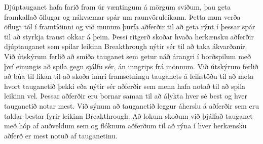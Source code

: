 Djúptauganet hafa farið fram úr væntingum á mörgum sviðum, þau geta framkallað öflugar og nákvæmar spár um raunvöruleikann. Þetta mun verða öflugt tól í framtíðinni og við munum þurfa aðferðir til að geta rýnt í þessar spár til að styrkja traust okkar á þeim. Þessi ritgerð skoðar hvaða herkænsku aðferðir djúptauganet sem spilar leikinn Breakthrough nýtir sér til að taka ákvarðanir. Við útskýrum ferlið að smíða tauganet sem getur náð árangri í borðspilum með því einungis að spila gegn sjálfu sér, án inngrips frá mönnum. Við útskýrum ferlið að búa til líkan til að skoða innri framsetningu tauganets á leikstöðu til að meta hvort tauganetið þekki eða nýtir sér aðferðir sem menn hafa notað til að spila leikinn vel. Þessar aðferðir eru bornar saman til að álykta hver sé best og hver tauganetið notar mest. Við sýnum að tauganetið leggur áherslu á aðferðir sem eru taldar bestar fyrir leikinn Breakthrough. Að lokum skoðum við þjálfað tauganet með hóp af auðveldum sem og flóknum aðferðum til að rýna í hver herkænsku aðferð er mest notuð af tauganetinu.
